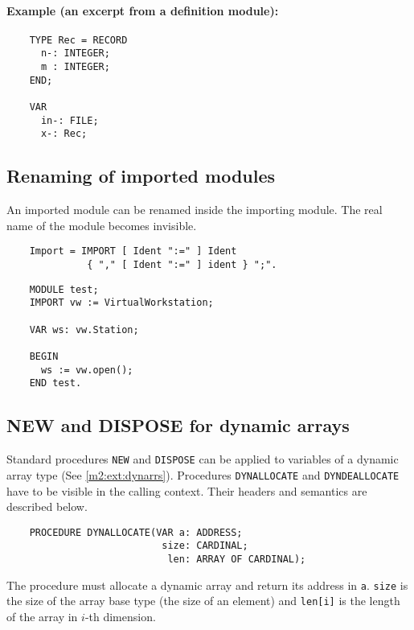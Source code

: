 \paragraph{Example (an excerpt from a definition module):}
\begin{verbatim}
    TYPE Rec = RECORD
      n-: INTEGER;
      m : INTEGER;
    END;

    VAR
      in-: FILE;
      x-: Rec;
\end{verbatim}

\subsection{Renaming of imported modules}
\mextonly

An imported module can be renamed inside the importing module. The real
name of the module becomes invisible.
\begin{verbatim}
    Import = IMPORT [ Ident ":=" ] Ident
              { "," [ Ident ":=" ] ident } ";".
\end{verbatim}

\Example
\begin{verbatim}
    MODULE test;
    IMPORT vw := VirtualWorkstation;

    VAR ws: vw.Station;

    BEGIN
      ws := vw.open();
    END test.
\end{verbatim}

\subsection{NEW and DISPOSE for dynamic arrays}\label{m2:ext:NEW}

Standard procedures {\tt NEW} and {\tt DISPOSE} can be applied to
variables of a dynamic array type (See \ref{m2:ext:dynarrs}).
Procedures {\tt DYNALLOCATE} and {\tt DYNDEALLOCATE} have to be visible
in the calling context. Their headers and semantics are described below.

\begin{verbatim}
    PROCEDURE DYNALLOCATE(VAR a: ADDRESS;
                           size: CARDINAL;
                            len: ARRAY OF CARDINAL);
\end{verbatim}

The procedure must allocate a dynamic array and return its address in \verb'a'.
\verb|size| is the size of the array base type (the size of an element)
and \verb|len[i]| is the length of the array in $i$-th dimension.

